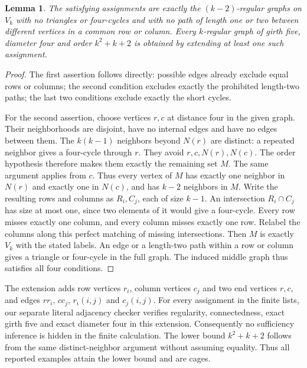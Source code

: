 \documentclass[11pt,a4paper]{article}
\newtheorem{lemma}[proposition]{Lemma}
\begin{document}
\begin{lemma}
The satisfying assignments are exactly the $(k-2)$-regular graphs on $V_k$
with no triangles or four-cycles and with no path of length one or two between
different vertices in a common row or column.
Every $k$-regular graph of girth five, diameter four and order $k^2+k+2$
is obtained by extending at least one such assignment.
\end{lemma}
\begin{proof}
The first assertion follows directly: possible edges already exclude equal
rows or columns; the second condition excludes exactly the prohibited
length-two paths; the last two conditions exclude exactly the short cycles.

For the second assertion, choose vertices $r,c$ at distance four in the given
graph. Their neighborhoods are disjoint, have no internal edges and have no
edges between them. The $k(k-1)$ neighbors beyond $N(r)$ are distinct: a
repeated neighbor gives a four-cycle through $r$. They avoid $r,c,N(r),N(c)$.
The order hypothesis therefore makes them exactly the remaining set $M$.
The same argument applies from $c$. Thus every vertex of $M$ has exactly one
neighbor in $N(r)$ and exactly one in $N(c)$, and has $k-2$ neighbors in $M$.
Write the resulting rows and columns as $R_i,C_j$, each of size $k-1$.
An intersection $R_i\cap C_j$ has size at most one, since two elements of it
would give a four-cycle. Every row misses exactly one column, and every
column misses exactly one row. Relabel the columns along this perfect
matching of missing intersections. Then $M$ is exactly $V_k$ with the stated
labels. An edge or a length-two path within a row or column gives a triangle
or four-cycle in the full graph. The induced middle graph thus satisfies
all four conditions.
\end{proof}
The extension adds row vertices $r_i$, column vertices $c_j$ and two end
vertices $r,c$, and edges $rr_i$, $cc_j$, $r_i(i,j)$ and $c_j(i,j)$.
For every assignment in the finite lists, our separate literal adjacency
checker verifies regularity, connectedness, exact girth five and exact
diameter four in this extension. Consequently no sufficiency inference is
hidden in the finite calculation. The lower bound $k^2+k+2$ follows from the
same distinct-neighbor argument without assuming equality. Thus all reported
examples attain the lower bound and are cages.
\end{document}
